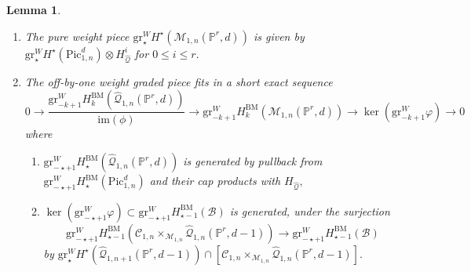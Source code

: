 \documentclass[10pt,a4paper]{amsart}
\newtheorem{lemma}{Lemma}
\newcommand{\PP}{\mathbb{P}}
\newcommand{\gr}{\mathrm{gr}}
\begin{document}
\begin{lemma}\label{lem:m1nrd} \label{lem:m1nrdoff}
  \begin{enumerate}
    \item The pure weight piece $\mathrm{gr}^W_\star H^\star(\mathcal{M}_{1,n}(\mathbb{P}^r,d))$ is given by $\mathrm{gr}^W_\star H^\star(\mathrm{Pic}^d_{1,n})\otimes H_{\hat{\mathcal{Q}}}^i$ for $ 0 \leq i\leq r.$
    \item The off-by-one weight graded piece fits in a short exact sequence \begin{equation} 0\to \frac{\mathrm{gr}^W_{-k+1}H_k^{\mathrm{BM}}(\hat{\mathcal{Q}}_{1,n}(\mathbb{P}^r,d))}{\mathrm{im}(\phi)}\to \mathrm{gr}^W_{-k+1} H_k^{\mathrm{BM}}(\mathcal{M}_{1,n}(\PP^r,d))\to \ker(\gr^W_{-k+1}\varphi)\to 0\end{equation} where \begin{enumerate}
    \item $\gr^{W}_{-\star+1}H_\star^{\mathrm{BM}}(\hat{\mathcal{Q}}_{1,n}(\PP^r,d))$ is generated by pullback from $\gr^{W}_{-\star+1}H_\star^{\mathrm{BM}}(\mathrm{Pic}^d_{1,n})$ and their cap products with $H_{\hat{\mathcal{Q}}},$
    \item $\ker(\gr^W_{-\star+1}\varphi)\subset \gr^W_{-\star+1} H_{{\star-1}}^{\mathrm{BM}}(\mathcal{B})$ is generated, under the surjection $$\gr^W_{-\star+1} H_{{\star-1}}^{\mathrm{BM}}(\mathcal{C}_{1,n}\times_{\mathcal{M}_{1,n}}\hat{\mathcal{Q}}_{1,n}(\PP^r,d-1))\to \gr^W_{-\star+1} H_{{\star-1}}^{\mathrm{BM}}(\mathcal{B})$$ by $\mathrm{gr}^W_{\star} H^\star(\hat{\mathcal{Q}}_{1,n+1}(\PP^r,d-1))\cap [\mathcal{C}_{1,n}\times_{\mathcal{M}_{1,n}}\hat{\mathcal{Q}}_{1,n}(\PP^r,d-1)].$
    \end{enumerate}
  \end{enumerate}
\end{lemma}
\end{document}
